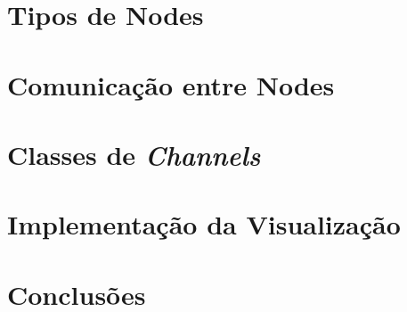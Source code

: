\section{Tipos de Nodes}
\label{chap:imp:node:tipos}



\section{Comunicação entre Nodes}
\section{Classes de \emph{Channels}}



\section{Implementação da Visualização}

\section{Conclusões}
